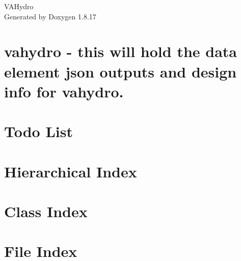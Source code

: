 \let\mypdfximage\pdfximage\def\pdfximage{\immediate\mypdfximage}\documentclass[twoside]{book}
\newcommand{\+}{\discretionary{\mbox{\scriptsize$\hookleftarrow$}}{}{}}
\newcommand{\clearemptydoublepage}{%
  \newpage{\pagestyle{empty}\cleardoublepage}%
}
\begin{document}
\hypersetup{pageanchor=false,
             bookmarksnumbered=true,
             pdfencoding=unicode
            }
\begin{titlepage}
\vspace*{7cm}
\begin{center}%
{\Large V\+A\+Hydro }\\
\vspace*{1cm}
{\large Generated by Doxygen 1.8.17}\\
\end{center}
\end{titlepage}
\clearemptydoublepage
{}
\tableofcontents
\clearemptydoublepage
{}
\hypersetup{pageanchor=true}

\chapter{vahydro -\/ this will hold the data element json outputs and design info for vahydro.}
\label{md_README}

\chapter{Todo List}
\label{todo}

\chapter{Hierarchical Index}

\chapter{Class Index}

\chapter{File Index}

\end{document}
